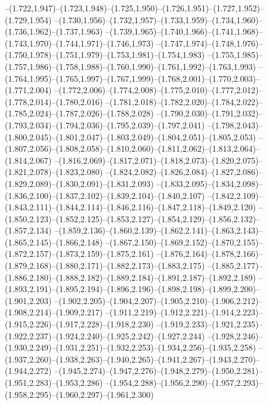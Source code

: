   --(1.722,1.947)--(1.723,1.948)--(1.725,1.950)--(1.726,1.951)--(1.727,1.952)--(1.729,1.954)%
  --(1.730,1.956)--(1.732,1.957)--(1.733,1.959)--(1.734,1.960)--(1.736,1.962)--(1.737,1.963)%
  --(1.739,1.965)--(1.740,1.966)--(1.741,1.968)--(1.743,1.970)--(1.744,1.971)--(1.746,1.973)%
  --(1.747,1.974)--(1.748,1.976)--(1.750,1.978)--(1.751,1.979)--(1.753,1.981)--(1.754,1.983)%
  --(1.755,1.985)--(1.757,1.986)--(1.758,1.988)--(1.760,1.990)--(1.761,1.992)--(1.763,1.993)%
  --(1.764,1.995)--(1.765,1.997)--(1.767,1.999)--(1.768,2.001)--(1.770,2.003)--(1.771,2.004)%
  --(1.772,2.006)--(1.774,2.008)--(1.775,2.010)--(1.777,2.012)--(1.778,2.014)--(1.780,2.016)%
  --(1.781,2.018)--(1.782,2.020)--(1.784,2.022)--(1.785,2.024)--(1.787,2.026)--(1.788,2.028)%
  --(1.790,2.030)--(1.791,2.032)--(1.793,2.034)--(1.794,2.036)--(1.795,2.039)--(1.797,2.041)%
  --(1.798,2.043)--(1.800,2.045)--(1.801,2.047)--(1.803,2.049)--(1.804,2.051)--(1.805,2.053)%
  --(1.807,2.056)--(1.808,2.058)--(1.810,2.060)--(1.811,2.062)--(1.813,2.064)--(1.814,2.067)%
  --(1.816,2.069)--(1.817,2.071)--(1.818,2.073)--(1.820,2.075)--(1.821,2.078)--(1.823,2.080)%
  --(1.824,2.082)--(1.826,2.084)--(1.827,2.086)--(1.829,2.089)--(1.830,2.091)--(1.831,2.093)%
  --(1.833,2.095)--(1.834,2.098)--(1.836,2.100)--(1.837,2.102)--(1.839,2.104)--(1.840,2.107)%
  --(1.842,2.109)--(1.843,2.111)--(1.844,2.114)--(1.846,2.116)--(1.847,2.118)--(1.849,2.120)%
  --(1.850,2.123)--(1.852,2.125)--(1.853,2.127)--(1.854,2.129)--(1.856,2.132)--(1.857,2.134)%
  --(1.859,2.136)--(1.860,2.139)--(1.862,2.141)--(1.863,2.143)--(1.865,2.145)--(1.866,2.148)%
  --(1.867,2.150)--(1.869,2.152)--(1.870,2.155)--(1.872,2.157)--(1.873,2.159)--(1.875,2.161)%
  --(1.876,2.164)--(1.878,2.166)--(1.879,2.168)--(1.880,2.171)--(1.882,2.173)--(1.883,2.175)%
  --(1.885,2.177)--(1.886,2.180)--(1.888,2.182)--(1.889,2.184)--(1.891,2.187)--(1.892,2.189)%
  --(1.893,2.191)--(1.895,2.194)--(1.896,2.196)--(1.898,2.198)--(1.899,2.200)--(1.901,2.203)%
  --(1.902,2.205)--(1.904,2.207)--(1.905,2.210)--(1.906,2.212)--(1.908,2.214)--(1.909,2.217)%
  --(1.911,2.219)--(1.912,2.221)--(1.914,2.223)--(1.915,2.226)--(1.917,2.228)--(1.918,2.230)%
  --(1.919,2.233)--(1.921,2.235)--(1.922,2.237)--(1.924,2.240)--(1.925,2.242)--(1.927,2.244)%
  --(1.928,2.246)--(1.930,2.249)--(1.931,2.251)--(1.932,2.253)--(1.934,2.256)--(1.935,2.258)%
  --(1.937,2.260)--(1.938,2.263)--(1.940,2.265)--(1.941,2.267)--(1.943,2.270)--(1.944,2.272)%
  --(1.945,2.274)--(1.947,2.276)--(1.948,2.279)--(1.950,2.281)--(1.951,2.283)--(1.953,2.286)%
  --(1.954,2.288)--(1.956,2.290)--(1.957,2.293)--(1.958,2.295)--(1.960,2.297)--(1.961,2.300)%
